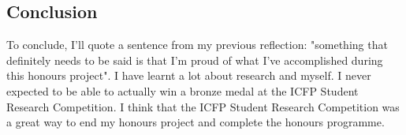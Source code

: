 \documentclass[notitlepage]{article}
\begin{document}
\subsection{Conclusion}
To conclude, I'll quote a sentence from my previous reflection: "something that definitely needs to be said is that I'm proud of what I've accomplished during this honours project". I have learnt a lot about research and myself. I never expected to be able to actually win a bronze medal at the ICFP Student Research Competition. I think that the ICFP Student Research Competition was a great way to end my honours project and complete the honours programme.
\end{document}
